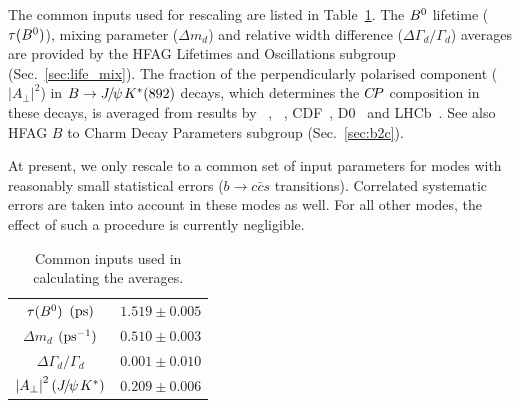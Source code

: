 \label{sec:cp_uta:common_inputs}

The common inputs used for rescaling are listed in 
Table~\ref{tab:cp_uta:common_inputs}.
The $B^0$ lifetime ($\tau(B^0)$), mixing parameter ($\Delta m_d$) and relative width difference ($\Delta\Gamma_d / \Gamma_d$)
averages are provided by the HFAG Lifetimes and Oscillations 
subgroup (Sec.~\ref{sec:life_mix}).
The fraction of the perpendicularly polarised component 
($\left| A_{\perp} \right|^2$) in $B \to {J\mskip -3mu/\mskip -2mu\psi\mskip 2mu} K^*(892)$ decays,
which determines the $C\!P$ composition in these decays, 
is averaged from results by 
\babar~\cite{Aubert:2007hz}, \belle~\cite{Itoh:2005ks}, CDF~\cite{Acosta:2004gt}, D0~\cite{Abazov:2008jz} and LHCb~\cite{Aaij:2013cma}.
See also HFAG $B$ to Charm Decay Parameters subgroup (Sec.~\ref{sec:b2c}).

At present, we only rescale to a common set of input parameters
for modes with reasonably small statistical errors
($b \to c\bar{c}s$ transitions).
Correlated systematic errors are taken into account
in these modes as well.
For all other modes, the effect of such a procedure is 
currently negligible.

\begin{table}[htb]
  \begin{center}
    \caption{
      Common inputs used in calculating the averages.
    }
    \vspace{0.2cm}
    \setlength{\tabcolsep}{1.0pc}
    \begin{tabular}{cc} \hline 
      $\tau(B^0)$ $({\rm ps})$  & $1.519 \pm 0.005$  \\
      $\Delta m_d$ $({\rm ps}^{-1})$ & $0.510 \pm 0.003$ \\
      $\Delta\Gamma_d / \Gamma_d$ & $0.001 \pm 0.010$ \\
      $\left| A_{\perp} \right|^2 ({J\mskip -3mu/\mskip -2mu\psi\mskip 2mu} K^*)$ & $0.209 \pm 0.006$ \\
      \hline
    \end{tabular}
    \label{tab:cp_uta:common_inputs}
  \end{center}
\end{table}

